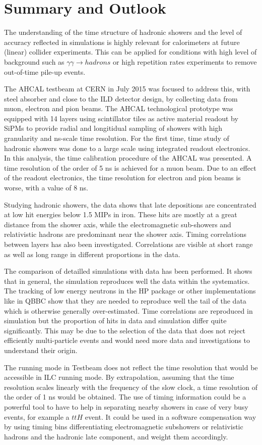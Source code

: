 \section{Summary and Outlook}

The understanding of the time structure of hadronic showers and the level of accuracy reflected in \geant simulations is highly relevant for calorimeters at future (linear) collider experiments. This can be applied for conditions with high level of background such as $\gamma\gamma \rightarrow hadrons$ or high repetition rates experiments to remove out-of-time pile-up events.

The AHCAL testbeam at CERN in July 2015 was focused to address this, with steel absorber and close to the ILD detector design, by collecting data from muon, electron and pion beams. The AHCAL technological prototype was equipped with 14 layers using scintillator tiles as active material readout by SiPMs to provide radial and longitidual sampling of showers with high granularity and ns-scale time resolution. For the first time, time study of hadronic showers was done to a large scale using integrated readout electronics.
In this analysis, the time calibration procedure of the AHCAL was presented. A time resolution of the order of 5 ns is achieved for a muon beam. Due to an effect of the readout electronics, the time resolution for electron and pion beams is worse, with a value of 8 ns.

Studying hadronic showers, the data shows that late depositions are concentrated at low hit energies below 1.5 MIPs in iron. These hits are mostly at a great distance from the shower axis, while the electromagnetic sub-showers and relativistic hadrons are predominant near the shower axis. Timing correlations between layers has also been investigated. Correlations are visible at short range as well as long range in different proportions in the data.

The comparison of detailled simulations with data has been performed. It shows that in general, the simulation reproduces well the data within the systematics. The tracking of low energy neutrons in the HP package or other implementations like in QBBC show that they are needed to reproduce well the tail of the data which is otherwise generally over-estimated. Time correlations are reproduced in simulation but the proportion of hits in data and simulation differ quite significantly. This may be due to the selection of the data that does not reject efficiently multi-particle events and would need more data and investigations to understand their origin.

The running mode in Testbeam does not reflect the time resolution that would be accessible in ILC running mode. By extrapolation, assuming that the time resolution scales linearly with the frequency of the slow clock, a time resolution of the order of 1 ns would be obtained. The use of timing information could be a powerful tool to have to help in separating nearby showers in case of very busy events, for example a $ttH$ event. It could be used in a software compensation way by using timing bins differentiating electromagnetic subshowers or relativistic hadrons and the hadronic late component, and weight them accordingly.
